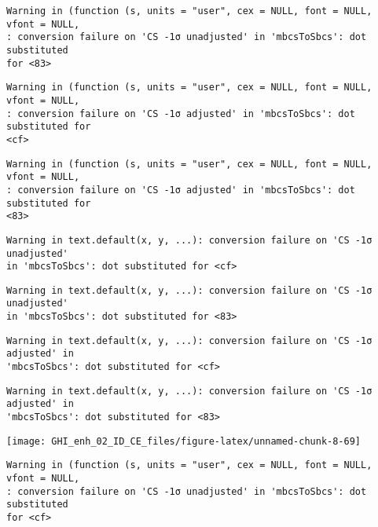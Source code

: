 \documentclass[
  10pt,
  a4paper,oneside]{article}
\begin{document}
\begin{verbatim}
Warning in (function (s, units = "user", cex = NULL, font = NULL, vfont = NULL,
: conversion failure on 'CS -1σ unadjusted' in 'mbcsToSbcs': dot substituted
for <83>
\end{verbatim}

\begin{verbatim}
Warning in (function (s, units = "user", cex = NULL, font = NULL, vfont = NULL,
: conversion failure on 'CS -1σ adjusted' in 'mbcsToSbcs': dot substituted for
<cf>
\end{verbatim}

\begin{verbatim}
Warning in (function (s, units = "user", cex = NULL, font = NULL, vfont = NULL,
: conversion failure on 'CS -1σ adjusted' in 'mbcsToSbcs': dot substituted for
<83>
\end{verbatim}

\begin{verbatim}
Warning in text.default(x, y, ...): conversion failure on 'CS -1σ unadjusted'
in 'mbcsToSbcs': dot substituted for <cf>
\end{verbatim}

\begin{verbatim}
Warning in text.default(x, y, ...): conversion failure on 'CS -1σ unadjusted'
in 'mbcsToSbcs': dot substituted for <83>
\end{verbatim}

\begin{verbatim}
Warning in text.default(x, y, ...): conversion failure on 'CS -1σ adjusted' in
'mbcsToSbcs': dot substituted for <cf>
\end{verbatim}

\begin{verbatim}
Warning in text.default(x, y, ...): conversion failure on 'CS -1σ adjusted' in
'mbcsToSbcs': dot substituted for <83>
\end{verbatim}

\begin{center}\texttt{[image: GHI\_enh\_02\_ID\_CE\_files/figure-latex/unnamed-chunk-8-69]} \end{center}

\begin{verbatim}
Warning in (function (s, units = "user", cex = NULL, font = NULL, vfont = NULL,
: conversion failure on 'CS -1σ unadjusted' in 'mbcsToSbcs': dot substituted
for <cf>
\end{verbatim}
\end{document}

